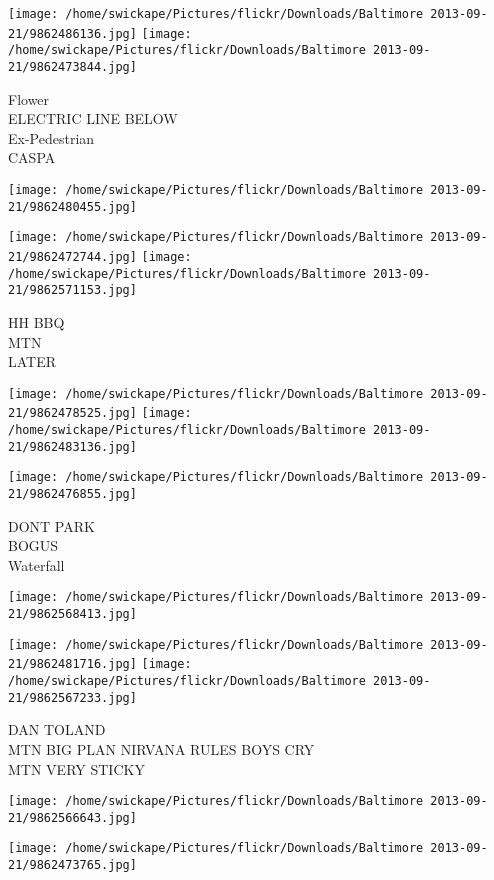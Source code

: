 \documentclass[10pt,letterpaper]{article}
\begin{document}
\texttt{[image: /home/swickape/Pictures/flickr/Downloads/Baltimore 2013-09-21/9862486136.jpg]}
\texttt{[image: /home/swickape/Pictures/flickr/Downloads/Baltimore 2013-09-21/9862473844.jpg]}

Flower\\
ELECTRIC LINE BELOW\\
Ex{-}Pedestrian\\
CASPA
\pagebreak

\texttt{[image: /home/swickape/Pictures/flickr/Downloads/Baltimore 2013-09-21/9862480455.jpg]}

\vspace{0.25in}
\texttt{[image: /home/swickape/Pictures/flickr/Downloads/Baltimore 2013-09-21/9862472744.jpg]}
\texttt{[image: /home/swickape/Pictures/flickr/Downloads/Baltimore 2013-09-21/9862571153.jpg]}

HH BBQ\\
MTN\\
LATER
\pagebreak

\texttt{[image: /home/swickape/Pictures/flickr/Downloads/Baltimore 2013-09-21/9862478525.jpg]}
\texttt{[image: /home/swickape/Pictures/flickr/Downloads/Baltimore 2013-09-21/9862483136.jpg]}

\vspace{0.25in}
\texttt{[image: /home/swickape/Pictures/flickr/Downloads/Baltimore 2013-09-21/9862476855.jpg]}

DONT PARK\\
BOGUS\\
Waterfall
\pagebreak

\texttt{[image: /home/swickape/Pictures/flickr/Downloads/Baltimore 2013-09-21/9862568413.jpg]}

\vspace{0.25in}
\texttt{[image: /home/swickape/Pictures/flickr/Downloads/Baltimore 2013-09-21/9862481716.jpg]}
\texttt{[image: /home/swickape/Pictures/flickr/Downloads/Baltimore 2013-09-21/9862567233.jpg]}

DAN TOLAND\\
MTN BIG PLAN NIRVANA RULES BOYS CRY\\
MTN VERY STICKY
\pagebreak

\texttt{[image: /home/swickape/Pictures/flickr/Downloads/Baltimore 2013-09-21/9862566643.jpg]}

\vspace{0.25in}
\texttt{[image: /home/swickape/Pictures/flickr/Downloads/Baltimore 2013-09-21/9862473765.jpg]}
\end{document}
